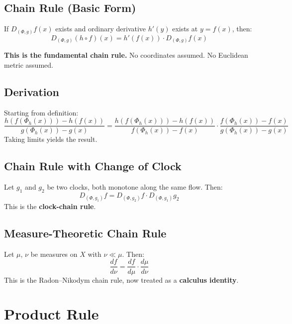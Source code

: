 \documentclass[12pt, oneside]{article}
\begin{document}
\subsection{Chain Rule (Basic Form)}

If $D_{(\Phi,g)} f(x)$ exists and ordinary derivative $h'(y)$ exists at $y = f(x)$, then:
\begin{equation}
D_{(\Phi,g)}(h \circ f)(x) = h'(f(x)) \cdot D_{(\Phi,g)} f(x)
\end{equation}

\textbf{This is the fundamental chain rule.} No coordinates assumed. No Euclidean metric assumed.

\subsection{Derivation}

Starting from definition:
\begin{equation}
\frac{h(f(\Phi_h(x))) - h(f(x))}{g(\Phi_h(x)) - g(x)} = \frac{h(f(\Phi_h(x))) - h(f(x))}{f(\Phi_h(x)) - f(x)} \cdot \frac{f(\Phi_h(x)) - f(x)}{g(\Phi_h(x)) - g(x)}
\end{equation}
Taking limits yields the result.

\subsection{Chain Rule with Change of Clock}

Let $g_1$ and $g_2$ be two clocks, both monotone along the same flow. Then:
\begin{equation}
D_{(\Phi,g_1)} f = D_{(\Phi,g_2)} f \cdot D_{(\Phi,g_1)} g_2
\end{equation}
This is the \textbf{clock-chain rule}.

\subsection{Measure-Theoretic Chain Rule}

Let $\mu$, $\nu$ be measures on $X$ with $\nu \ll \mu$. Then:
\begin{equation}
\frac{df}{d\nu} = \frac{df}{d\mu} \cdot \frac{d\mu}{d\nu}
\end{equation}
This is the Radon--Nikodym chain rule, now treated as a \textbf{calculus identity}.

\section{Product Rule}
\end{document}

